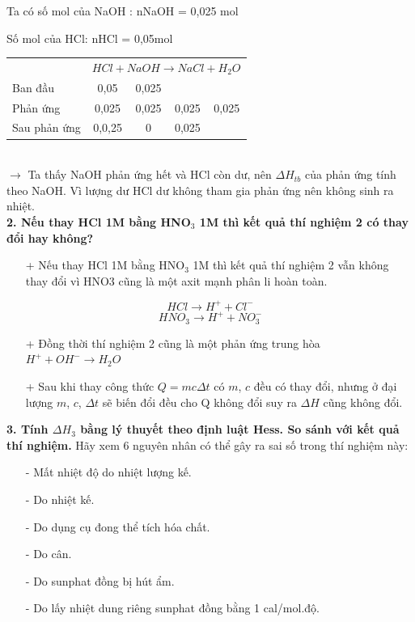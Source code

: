 \documentclass[12pt,a4paper]{report}
\begin{document}
Ta có số mol của NaOH : nNaOH = 0,025 mol 

Số mol của HCl: nHCl = 0,05mol 
\begin{table}[h!]
    \begin{tabular}{lcccc}
                 & \multicolumn{4}{c}{$HCl + NaOH \rightarrow NaCl + H_2O$} \\
    Ban đầu      & 0,05          & 0,025        &             &             \\
    Phản ứng     & 0,025         & 0,025        & 0,025       & 0,025       \\
    Sau phản ứng & 0,0,25        & 0            & 0,025       &            
    \end{tabular}
\end{table}\\
$\rightarrow$ Ta thấy NaOH phản ứng hết và HCl còn dư, nên $\Delta H_{tb}$ của phản ứng tính theo NaOH. Vì lượng dư HCl dư không tham gia phản ứng nên không sinh ra nhiệt. \\
\textbf{2. Nếu thay HCl 1M bằng HNO$_3$ 1M thì kết quả thí nghiệm 2 có thay đổi hay không?}
\begin{itemize}
    \item[+] Nếu thay HCl 1M bằng HNO$_3$ 1M thì kết quả thí nghiệm 2 vẫn không thay đổi vì HNO3 cũng là một axit mạnh phân li hoàn toàn. 
\end{itemize}
\[
    HCl \rightarrow H^+ + Cl^- 
\]
\[
    HNO_3 \rightarrow H^+ + NO_3^- 
\]
\begin{itemize}
    \item[+] Đồng thời thí nghiệm 2 cũng là một phản ứng trung hòa $H^+ + OH^- \rightarrow H_2O$
    \item[+] Sau khi thay công thức $Q=mc\Delta t$ có $m$, $c$ đều có thay đổi, nhưng ở đại lượng $m$, $c$, $\Delta t$ sẽ biến đổi đều cho Q không đổi suy ra $\Delta H$ cũng không đổi. 
\end{itemize}
\textbf{3. Tính $\Delta H_3$ bằng lý thuyết theo định luật Hess. So sánh với kết quả thí nghiệm.}
Hãy xem 6 nguyên nhân có thể gây ra sai số trong thí nghiệm này: 
\begin{itemize}
    \item[-] Mất nhiệt độ do nhiệt lượng kế.
    \item[-] Do nhiệt kế.
    \item[-] Do dụng cụ đong thể tích hóa chất.
    \item[-] Do cân.
    \item[-] Do sunphat đồng bị hút ẩm.
    \item[-] Do lấy nhiệt dung riêng sunphat đồng bằng 1 cal/mol.độ.
\end{itemize}
\end{document}
